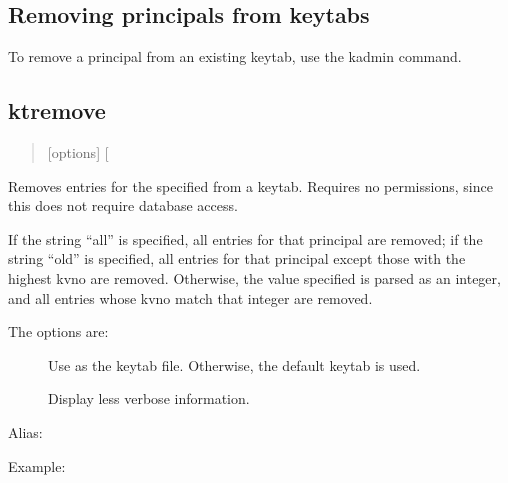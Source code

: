 \documentclass[letterpaper,10pt,english]{sphinxmanual}
\begin{document}
\subsection{Removing principals from keytabs}
\label{\detokenize{admin/appl_servers:removing-principals-from-keytabs}}
To remove a principal from an existing keytab, use the kadmin
 command.


\subsection{ktremove}
\label{\detokenize{admin/appl_servers:ktremove}}\begin{quote}

 {[}options{]}  {[} \textbar{}  \textbar{} \sphinxstyleemphasis{old}{]}
\end{quote}

Removes entries for the specified  from a keytab.  Requires
no permissions, since this does not require database access.

If the string “all” is specified, all entries for that principal are
removed; if the string “old” is specified, all entries for that
principal except those with the highest kvno are removed.  Otherwise,
the value specified is parsed as an integer, and all entries whose
kvno match that integer are removed.

The options are:
\begin{description}
\item[{ }] \leavevmode
Use  as the keytab file.  Otherwise, the default keytab is
used.

\item[{}] \leavevmode
Display less verbose information.

\end{description}

Alias: 

Example:

%
\begin{sphinxVerbatim}[commandchars=\\\{\}]
   
         
\end{sphinxVerbatim}
\end{document}
